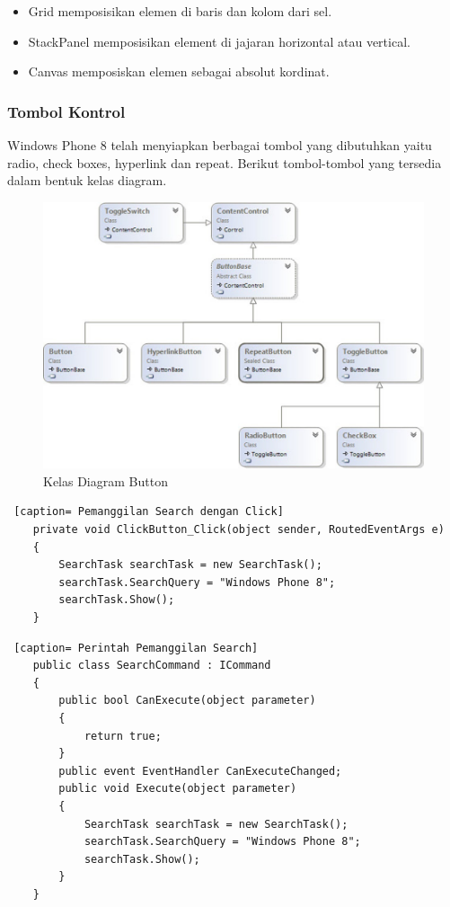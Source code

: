 \begin{itemize}
	\item Grid memposisikan elemen di baris dan kolom dari sel.
	\item StackPanel memposisikan element di jajaran horizontal atau vertical.
	\item Canvas memposiskan elemen sebagai absolut kordinat.
\end{itemize}
	
\subsubsection{Tombol Kontrol}
\label{subsubsec:Tombol Kontrol}
\hspace{0.5cm} Windows Phone 8 telah menyiapkan berbagai tombol yang dibutuhkan yaitu radio, check boxes, hyperlink dan repeat. Berikut tombol-tombol yang tersedia dalam bentuk kelas diagram.

\begin{figure}[h]
	\centering
		\includegraphics[scale=0.5]{Gambar/button_class_diagram.jpg}
	\caption{Kelas Diagram Button}
	\label{fig:button_class_diagram}
\end{figure}

\begin{lstlisting} [caption= Pemanggilan Search dengan Click]
	private void ClickButton_Click(object sender, RoutedEventArgs e)
	{
		SearchTask searchTask = new SearchTask();
		searchTask.SearchQuery = "Windows Phone 8";
		searchTask.Show();
	}
\end{lstlisting}

\begin{lstlisting} [caption= Perintah Pemanggilan Search]
	public class SearchCommand : ICommand
	{
		public bool CanExecute(object parameter)
		{
			return true;
		}
		public event EventHandler CanExecuteChanged;
		public void Execute(object parameter)
		{
			SearchTask searchTask = new SearchTask();
			searchTask.SearchQuery = "Windows Phone 8";
			searchTask.Show();
		}
	}
\end{lstlisting}


